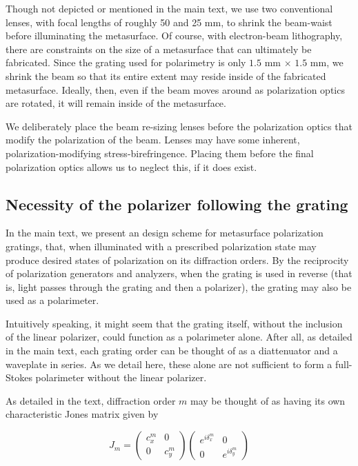 \documentclass[footinbib,aps,prl,superscriptaddress]{revtex4-1}
\begin{document}
Though not depicted or mentioned in the main text, we use two conventional lenses, with focal lengths of roughly 50 and 25 mm, to shrink the beam-waist before illuminating the metasurface. Of course, with electron-beam lithography, there are constraints on the size of a metasurface that can ultimately be fabricated. Since the grating used for polarimetry is only $1.5$ mm $\times$ $1.5$ mm, we shrink the beam so that its entire extent may reside inside of the fabricated metasurface. Ideally, then, even if the beam moves around as polarization optics are rotated, it will remain inside of the metasurface.

We deliberately place the beam re-sizing lenses before the polarization optics that modify the polarization of the beam. Lenses may have some inherent, polarization-modifying stress-birefringence. Placing them before the final polarization optics allows us to neglect this, if it does exist. 

\subsection{Necessity of the polarizer following the grating}

In the main text, we present an design scheme for metasurface polarization gratings, that, when illuminated with a prescribed polarization state may produce desired states of polarization on its diffraction orders. By the reciprocity of polarization generators and analyzers, when the grating is used in reverse (that is, light passes through the grating and then a polarizer), the grating may also be used as a polarimeter.

Intuitively speaking, it might seem that the grating itself, without the inclusion of the linear polarizer, could function as a polarimeter alone. After all, as detailed in the main text, each grating order can be thought of as a diattenuator and a waveplate in series. As we detail here, these alone are not sufficient to form a full-Stokes polarimeter without the linear polarizer.

As detailed in the text, diffraction order $m$ may be thought of as having its own characteristic Jones matrix given by

\begin{equation}
	J_m = \begin{pmatrix}
	c_x^m & 0 \\ 0 & c_y^m
	\end{pmatrix}
	\begin{pmatrix}
	e^{i \delta_x^m} & 0 \\ 0 & e^{i \delta_y^m}
	\end{pmatrix}
\end{equation}
\end{document}
